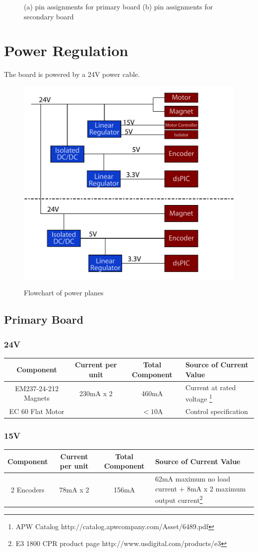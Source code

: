 \documentclass{article}
\begin{document}
\begin{figure}[h!]
\begin{subfigure}{0.4\textwidth}
		\label{pinout2}
	\end{subfigure}
	\caption{ (a) pin assignments for primary board (b) pin assignments for secondary board}
\end{figure}

\section{Power Regulation}
The board is powered by a 24V power cable.  
\begin{figure}[h]
	\centering
	\includegraphics[width=.5\textwidth]{V5PowerPath}
	\label{powerpath}
	\caption{Flowchart of power planes}
\end{figure}
\subsection{Primary Board}
\subsubsection*{24V}
\begin{longtable}{|c | c | c |  >{\centering\arraybackslash}p{} |} \hline
Component & Current per unit & Total Component & Source of Current Value\\ \hline
EM237-24-212 Magnets & 230mA x 2 & 460mA & Current at rated voltage \footnote{APW Catalog http://catalog.apwcompany.com/Asset/6489.pdf}\\ \hline
EC 60 Flat Motor & & $<10$A & Control specification\\ \hline
\end{longtable}
\subsubsection*{15V}
\begin{longtable}{|c | c | c |  >{\centering\arraybackslash}p{} |} \hline
Component & Current per unit & Total Component & Source of Current Value\\ \hline
2 Encoders & 78mA x 2 & 156mA & 62mA maximum no load current + 8mA x 2 maximum output current\footnote{E3 1800 CPR product page http://www.usdigital.com/products/e3}\\ \hline
\end{longtable}
\end{document}
